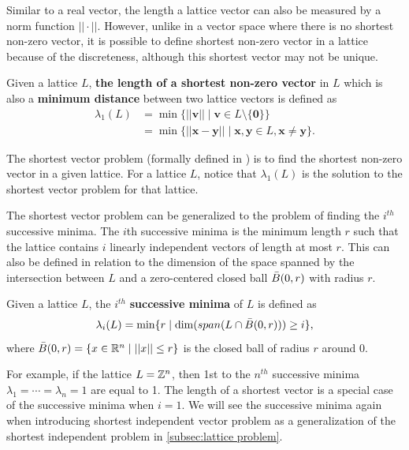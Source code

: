 \documentclass[../main.tex]{subfiles}
\begin{document}
Similar to a real vector, the length a lattice vector can also be measured by a norm function $||\cdot||$. However, unlike in a vector space where there is no shortest non-zero vector, it is possible to define shortest non-zero vector in a lattice because of the discreteness, although this shortest vector may not be unique.  
\begin{definition}
\reversemarginpar
{}
Given a lattice $L$, \textbf{the length of a shortest non-zero vector}  in $L$ which is also a \textbf{minimum distance} between two lattice vectors is defined as 
\begin{align*}
    \lambda_1(L) &= \min\{||\mathbf{v}|| \mid \mathbf{v} \in L \setminus \{\mathbf{0}\} \} \\
    &= \min \{||\mathbf{x} - \mathbf{y}|| \mid \mathbf{x}, \mathbf{y} \in L, \mathbf{x} \neq \mathbf{y} \}.
\end{align*}
\end{definition}

The shortest vector problem (formally defined in ) is to find the shortest non-zero vector in a given lattice. For a lattice $L$, notice that $\lambda_1(L)$ is the solution to the shortest vector problem for that lattice.

The shortest vector problem  can be generalized to the problem of finding the $i^{th}$ successive minima. The $i$th successive minima is the minimum length $r$ such that the lattice contains $i$ linearly independent vectors of length at most $r$. This can also be defined in relation to the dimension of the space spanned by the intersection between $L$ and a zero-centered closed ball $\Bar{B}(0,r)$ with radius $r$.

\begin{definition}
\reversemarginpar
{}
Given a lattice $L$, the $i^{th}$ \textbf{successive minima}  of $L$ is defined as 
\begin{equation*}
    \lambda_i(L) = \min\{r \mid \dim(span(L \cap \Bar{B}(0,r)))\ge i\},
\end{equation*}
where $\Bar{B}(0,r) = \{ x \in \mathbb{R}^n \mid ||x||\leq r \}$ is the closed ball of radius $r$ around 0.
\end{definition}

For example, if the lattice $L=\mathbb{Z}^n$, then 1st to the $n^{th}$ successive minima $\lambda_1= \cdots = \lambda_n=1$ are equal to 1. The length of a shortest vector is a special case of the successive minima when $i=1$. We will see the successive minima again when introducing shortest independent vector problem as a generalization of the shortest independent problem in \ref{subsec:lattice problem}. 
\end{document}
